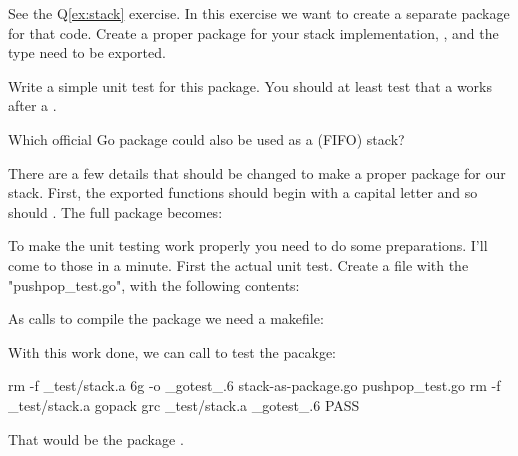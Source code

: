 \begin{Exercise}[title={Stack as package},difficulty=2]
\label{ex:stack-package}
\Question\label{ex:stack-package q1} 
See the Q\ref{ex:stack} exercise. In this exercise we want to create
a separate package for that code.
Create a proper package for your
stack implementation, ,  and the  type need to be
exported.

\Question\label{ex:stack-package q2} Write a simple unit test for this package.
You should at least test that a  works after a .

\Question\label{ex:stack-package q3} Which official Go package could
also be used as a (FIFO) stack?
\end{Exercise}

\begin{Answer}
\Question There are a few details that should be changed to make a proper package
for our stack. First, the exported functions should begin with a capital 
letter and so should . The full package becomes:


\Question To make the unit testing work properly you need to do some
preparations. I'll come to those in a minute. First the actual unit test.
Create a file with the "pushpop\_test.go", with the following contents:

As  calls  to compile the package we need a makefile:

With this work done, we can call  to test the pacakge:

\begin{display}
\pr {}
rm -f _test/stack.a
6g  -o _gotest_.6 stack-as-package.go  pushpop_test.go
rm -f _test/stack.a
gopack grc _test/stack.a _gotest_.6 
PASS
\end{display}

\Question That would be the package .
\end{Answer}
